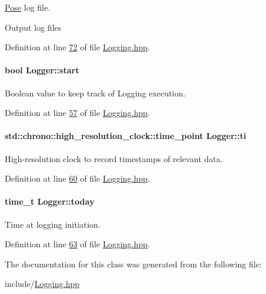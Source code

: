 \hyperlink{structPose}{Pose} log file. 

Output log files 

Definition at line \hyperlink{Logging_8hpp_source_l00072}{72} of file \hyperlink{Logging_8hpp_source}{Logging.\+hpp}.

\paragraph[{\texorpdfstring{start}{start}}]{\setlength{\rightskip}{0pt plus 5cm}bool Logger\+::start\hspace{0.3cm}{\ttfamily [private]}}\hypertarget{classLogger_a99c616f02a46e95f2e976ab7d880dbc5}{}\label{classLogger_a99c616f02a46e95f2e976ab7d880dbc5}


Boolean value to keep track of Logging execution. 



Definition at line \hyperlink{Logging_8hpp_source_l00057}{57} of file \hyperlink{Logging_8hpp_source}{Logging.\+hpp}.

\paragraph[{\texorpdfstring{ti}{ti}}]{\setlength{\rightskip}{0pt plus 5cm}std\+::chrono\+::high\+\_\+resolution\+\_\+clock\+::time\+\_\+point Logger\+::ti\hspace{0.3cm}{\ttfamily [private]}}\hypertarget{classLogger_a7f6f65922677036ca61ba12a19fdb719}{}\label{classLogger_a7f6f65922677036ca61ba12a19fdb719}


High-\/resolution clock to record timestamps of relevant data. 



Definition at line \hyperlink{Logging_8hpp_source_l00060}{60} of file \hyperlink{Logging_8hpp_source}{Logging.\+hpp}.

\paragraph[{\texorpdfstring{today}{today}}]{\setlength{\rightskip}{0pt plus 5cm}time\+\_\+t Logger\+::today\hspace{0.3cm}{\ttfamily [private]}}\hypertarget{classLogger_afe5c4b612d69878aa65ce940a042fd8c}{}\label{classLogger_afe5c4b612d69878aa65ce940a042fd8c}


Time at logging initiation. 



Definition at line \hyperlink{Logging_8hpp_source_l00063}{63} of file \hyperlink{Logging_8hpp_source}{Logging.\+hpp}.



The documentation for this class was generated from the following file\+:\begin{DoxyCompactItemize}
\item 
include/\hyperlink{Logging_8hpp}{Logging.\+hpp}\end{DoxyCompactItemize}
